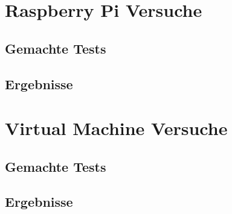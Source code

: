 \section{Raspberry Pi Versuche}
\label{sec:raspberryPiVersuche}
\subsection{Gemachte Tests}
\subsection{Ergebnisse}

\section{Virtual Machine Versuche}
\label{sec:VMVersuche}
\subsection{Gemachte Tests}
\subsection{Ergebnisse}


